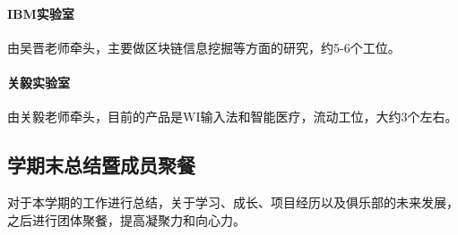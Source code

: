 \documentclass{club}
\begin{document}
\paragraph{IBM实验室}由吴晋老师牵头，主要做区块链信息挖掘等方面的研究，约5-6个工位。
\paragraph{关毅实验室}由关毅老师牵头，目前的产品是WI输入法和智能医疗，流动工位，大约3个左右。

\subsection{学期末总结暨成员聚餐}

对于本学期的工作进行总结，关于学习、成长、项目经历以及俱乐部的未来发展，之后进行团体聚餐，提高凝聚力和向心力。


\end{document}
